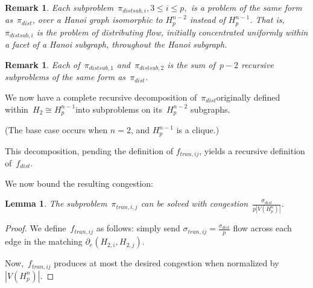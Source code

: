 \documentclass[
final
]{dmtcs-episciences}
\newcommand{\edgeh}[2]{\partial_e(#1,#2)}
\newtheorem{lemma}[theorem]{Lemma}
\newtheorem{remark}[theorem]{Remark}
\begin{document}
\begin{remark}\label{rmk:fdistsubrec}
Each subproblem~$\pi_{distsub,i}, 3 \leq i \leq p,$ is a problem of the same form as~$\pi_{dist}$, over a Hanoi graph isomorphic to $H_p^{n-2}$ instead of $H_p^{n-1}$. That is, $\pi_{distsub,i}$ is the problem of distributing flow, initially concentrated uniformly within a facet of a Hanoi subgraph, throughout the Hanoi subgraph.
\end{remark}

\begin{remark}\label{rmk:fdistsubrecj}
Each of~$\pi_{distsub,1}$ and~$\pi_{distsub,2}$ is the sum of~$p-2$ recursive subproblems of the same form as~$\pi_{dist}$.
\end{remark}

We now have a complete recursive decomposition of~$\pi_{dist}$\textemdash originally defined within~$H_2 \cong H_p^{n-1}$\textemdash into subproblems on its~$H_p^{n-2}$ subgraphs.

(The base case occurs when $n = 2$, and $H_p^{n-1}$ is a clique.)

This decomposition, pending the definition of $f_{tran,ij}$, yields a recursive definition of~$f_{dist}$.

We now bound the resulting congestion:

\begin{lemma}\label{lem:ftranrec}
The subproblem~$\pi_{tran,i,j}$ can be solved with congestion~$\frac{\sigma_{dist}}{p|V(H_p^n)|}$.
\end{lemma}
\begin{proof}
    We define~$f_{tran,ij}$ as follows: simply send $\sigma_{tran,ij} = \frac{\sigma_{dist}}{p}$ flow across each edge in the matching $\edgeh{H_{2,i}}{H_{2,j}}$.

    Now,~$f_{tran,ij}$ produces at most the desired congestion when normalized by~$|V(H_p^n)|$.
\end{proof}
\end{document}
